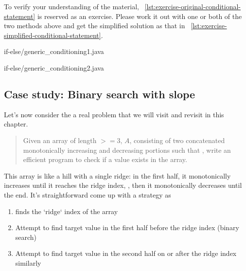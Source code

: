 To verify your understanding of the material,
~\autoref{lst:exercise-original-conditional-statement} is reserved as an exercise.
Please work it out with one or both of the two methods above and get the simplified solution as
that in ~\autoref{lst:exercise-simplified-conditional-statement}.
\begin{clisting}
    \begin{minipage}[t]{.4\textwidth}
        
        {if-else/generic_conditioning1.java}
    \end{minipage}\hfill
    \begin{minipage}[t]{.4\textwidth}
        
        {if-else/generic_conditioning2.java}
    \end{minipage}
\end{clisting}

\subsection{Case study: Binary search with slope}\label{subsec:case-study:binary-search-direction}

Let's now consider the a real problem that we will visit and revisit in this chapter.
\begin{quote}
    Given an array of length $>= 3$, $A$, consisting of two concatenated monotonically increasing
    and decreasing portions such that , write an efficient program to check if a  value exists in the array.
\end{quote}

This array is like a hill with a single ridge: in the first half, it monotonically increases until
it reaches the ridge index, , then it monotonically decreases until the end.
It's straightforward come up with a strategy as
\begin{enumerate}
    \item finds the `ridge` index of the array
    \item Attempt to find target value in the first half before the ridge index (binary search)
    \item Attempt to find target value in the second half on or after the ridge index similarly
\end{enumerate}

